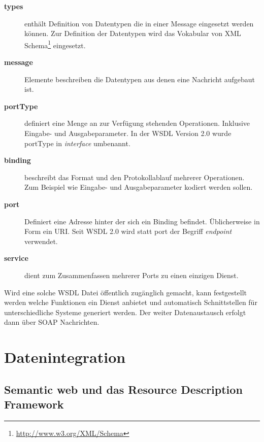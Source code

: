 \begin{description}
    \item[\textbf{types}] enthält Definition von Datentypen die in einer Message eingesetzt werden können. Zur Definition der Datentypen wird das Vokabular von XML Schema\footnote{\url{http://www.w3.org/XML/Schema}} eingesetzt.
    \item[\textbf{message}] Elemente beschreiben die Datentypen aus denen eine Nachricht aufgebaut ist.
    \item[\textbf{portType}] definiert eine Menge an zur Verfügung stehenden Operationen. Inklusive Eingabe- und Ausgabeparameter. In der WSDL Version 2.0 wurde portType in \emph{interface} umbenannt.
    \item[\textbf{binding}] beschreibt das Format und den Protokollablauf mehrerer Operationen. Zum Beispiel wie Eingabe- und Ausgabeparameter kodiert werden sollen. 
    \item[\textbf{port}] Definiert eine Adresse hinter der sich ein Binding befindet. Üblicherweise in Form ein URI. Seit WSDL 2.0 wird statt port der Begriff \emph{endpoint} verwendet.
    \item[\textbf{service}] dient zum Zusammenfassen mehrerer Ports zu einen einzigen Dienst.
\end{description}

Wird eine solche WSDL Datei öffentlich zugänglich gemacht, kann festgestellt werden welche Funktionen ein Dienst anbietet und automatisch Schnittstellen für unterschiedliche Systeme generiert werden. Der weiter Datenaustausch erfolgt dann über SOAP Nachrichten.




\section{Datenintegration} %
\label{sec:datenintegration}



\subsection{Semantic web und das Resource Description Framework} %
\label{sub:semantic_web_und_das_resource_description_framework}




